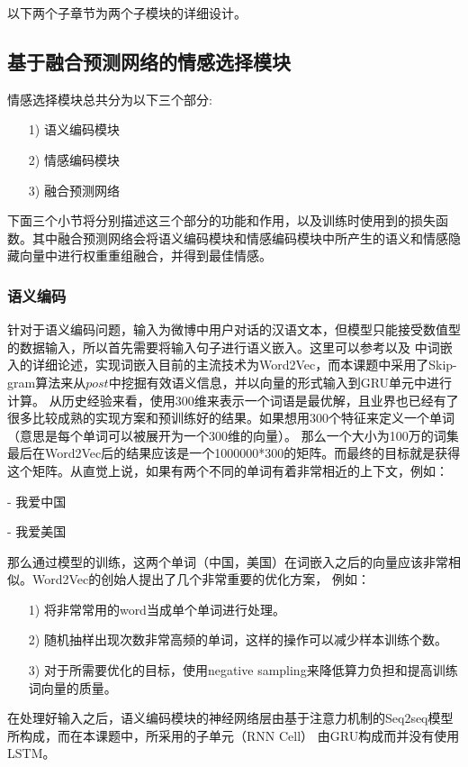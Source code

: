 \documentclass[supercite]{HustGraduPaper}
\theoremstyle{definition}
\begin{document}
以下两个子章节为两个子模块的详细设计。

\subsection{基于融合预测网络的情感选择模块}
情感选择模块总共分为以下三个部分:
\begin{itemize}
  \item [1)]语义编码模块
  \item [2)]情感编码模块
  \item [3)]融合预测网络
\end{itemize} 
下面三个小节将分别描述这三个部分的功能和作用，以及训练时使用到的损失函数。其中融合预测网络会将语义编码模块和情感编码模块中所产生的语义和情感隐藏向量中进行权重重组融合，并得到最佳情感。

\subsubsection{语义编码}
针对于语义编码问题，输入为微博中用户对话的汉语文本，但模型只能接受数值型的数据输入，所以首先需要将输入句子进行语义嵌入。这里可以参考\cite{mikolov2013efficient}以及
\cite{wordvector}中词嵌入的详细论述，实现词嵌入目前的主流技术为Word2Vec，而本课题中采用了Skip-gram算法来从$post$中挖掘有效语义信息，并以向量的形式输入到GRU单元中进行计算。
从历史经验来看，使用300维来表示一个词语是最优解，且业界也已经有了很多比较成熟的实现方案和预训练好的结果。如果想用300个特征来定义一个单词（意思是每个单词可以被展开为一个300维的向量）。
那么一个大小为100万的词集最后在Word2Vec后的结果应该是一个1000000*300的矩阵。而最终的目标就是获得这个矩阵。从直觉上说，如果有两个不同的单词有着非常相近的上下文，例如：
\begin{shaded*}
  - 我爱中国

  - 我爱美国
\end{shaded*}


那么通过模型的训练，这两个单词（中国，美国）在词嵌入之后的向量应该非常相似。Word2Vec的创始人提出了几个非常重要的优化方案，
例如：
\begin{itemize}
  \item [1)]将非常常用的word当成单个单词进行处理。
  \item [2)]随机抽样出现次数非常高频的单词，这样的操作可以减少样本训练个数。
  \item [3)]对于所需要优化的目标，使用negative sampling来降低算力负担和提高训练词向量的质量。
\end{itemize}


在处理好输入之后，语义编码模块的神经网络层由基于注意力机制的Seq2seq模型所构成，而在本课题中，所采用的子单元（RNN Cell）
由GRU构成而并没有使用LSTM。
\end{document}
